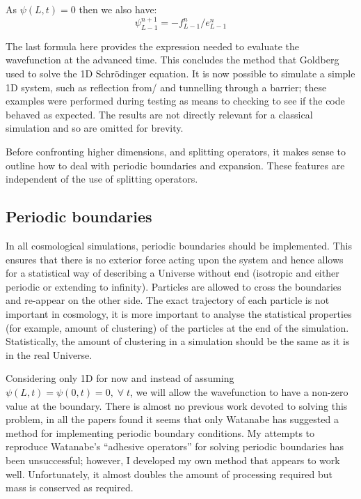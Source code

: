 \noindent As $\psi(L,t) = 0$ then we also have:
\begin{equation}
\psi_{L-1}^{n+1} = -f_{L-1}^n/e_{L-1}^n
\end{equation}

The last formula here provides the expression needed to evaluate the wavefunction at the advanced time. This concludes the method that Goldberg used to solve the 1D Schr\"odinger equation. It is now possible to simulate a simple 1D system, such as reflection from/ and tunnelling through a barrier; these examples were performed during testing as means to checking to see if the code behaved as expected. The results are not directly relevant for a classical simulation and so are omitted for brevity.

Before confronting higher dimensions, and splitting operators, it makes sense to outline how to deal with periodic boundaries and expansion. These features are independent of the use of splitting operators.

\subsection{Periodic boundaries}
\label{per_bound}
In all cosmological simulations, periodic boundaries should be implemented. This ensures that there is no exterior force acting upon the system and hence allows for a statistical way of describing a Universe without end (isotropic and either periodic or extending to infinity). Particles are allowed to cross the boundaries and re-appear on the other side. The exact trajectory of each particle is not important in cosmology, it is more important to analyse the statistical properties (for example, amount of clustering) of the particles at the end of the simulation. Statistically, the amount of clustering in a simulation should be the same as it is in the real Universe.

Considering only 1D for now and instead of assuming $\psi(L,t) = \psi(0,t) = 0, \; \forall \; t$, we will allow the wavefunction to have a non-zero value at the boundary. There is almost no previous work devoted to solving this problem, in all the papers found it seems that only Watanabe has suggested a method for implementing periodic boundary conditions. My attempts to reproduce Watanabe's ``adhesive operators'' \citep{bib_wat} for solving periodic boundaries has been unsuccessful; however, I developed my own method that appears to work well. Unfortunately, it almost doubles the amount of processing required but mass is conserved as required.

